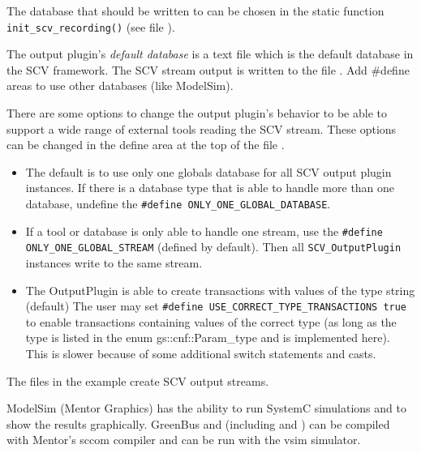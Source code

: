  The database that should be written to can be chosen in the static function 
 \lstinline|init_scv_recording()| (see file ).

The output plugin's {\em default database} is a text file which is the default database in the SCV framework. The SCV stream output is written to the file .  Add \#define areas to use other databases (like ModelSim).

There are some options to change the output plugin's behavior to be able to support a wide range of external tools reading the SCV stream. These options can be changed in the define area at the top of the file .

\begin{itemize}

  \item  The default is to use only one globals database for all SCV output plugin instances. If there is a database type that is able to handle more than one database, undefine the \newline
  \lstinline[language=TeX]|#define ONLY_ONE_GLOBAL_DATABASE|.

  \item  If a tool or database is only able to handle one stream, use the \lstinline[language=TeX]|#define ONLY_ONE_GLOBAL_STREAM| (defined by default). \newline
 Then all \lstinline|SCV_OutputPlugin| instances write to the same stream.

  \item  The OutputPlugin is able to create transactions with values of the type {\sffamily string} (default)
 The user may set \lstinline[language=TeX]|#define USE_CORRECT_TYPE_TRANSACTIONS true|
 to enable transactions containing values of the correct type (as long as the type is listed in the enum
 {\sffamily gs::cnf::Param\_type} and is implemented here). This is slower because of 
 some additional switch statements and casts.

\end{itemize}

The files  in the example  create SCV output streams.


{\sffamily ModelSim} (Mentor Graphics) has the ability to run SystemC simulations and to show the results graphically. GreenBus and \GreenControl (including \GreenConfig and \GreenAV) can be compiled with Mentor's {\sffamily sccom} compiler and can be run with the {\sffamily vsim} simulator.

